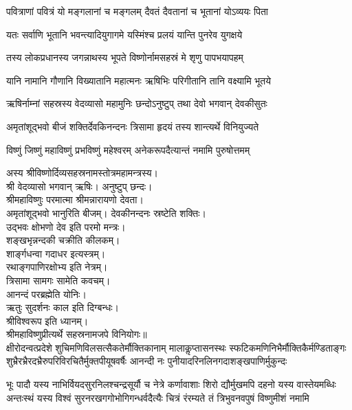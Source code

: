 \twolineshloka
{पवित्राणां पवित्रं यो मङ्गलानां च मङ्गलम्}
{दैवतं दैवतानां च भूतानां योऽव्ययः पिता}

\twolineshloka
{यतः सर्वाणि भूतानि भवन्त्यादियुगागमे}
{यस्मिंश्च प्रलयं यान्ति पुनरेव युगक्षये}

\twolineshloka
{तस्य लोकप्रधानस्य जगन्नाथस्य भूपते}
{विष्णोर्नामसहस्रं मे शृणु पापभयापहम्}

\twolineshloka
{यानि नामानि गौणानि विख्यातानि महात्मनः}
{ऋषिभिः परिगीतानि तानि वक्ष्यामि भूतये}

\twolineshloka
{ऋषिर्नाम्नां सहस्रस्य वेदव्यासो महामुनिः}
{छन्दोऽनुष्टुप् तथा देवो भगवान् देवकीसुतः}

\twolineshloka
{अमृतांशूद्भवो बीजं शक्तिर्देवकिनन्दनः}
{त्रिसामा हृदयं तस्य शान्त्यर्थे विनियुज्यते}

\twolineshloka
{विष्णुं जिष्णुं महाविष्णुं प्रभविष्णुं महेश्वरम्}
{अनेकरूपदैत्यान्तं नमामि पुरुषोत्तमम्}

अस्य श्रीविष्णोर्दिव्यसहस्रनामस्तोत्रमहामन्त्रस्य।\\
श्री वेदव्यासो भगवान् ऋषिः। अनुष्टुप् छन्दः।\\
श्रीमहाविष्णुः परमात्मा श्रीमन्नारायणो देवता।\\
अमृतांशूद्भवो भानुरिति बीजम्। देवकीनन्दनः स्रष्टेति शक्तिः।\\
उद्भवः क्षोभणो देव इति परमो मन्त्रः।\\
शङ्खभृन्नन्दकी चक्रीति कीलकम्।\\
शार्ङ्गधन्वा गदाधर इत्यस्त्रम्। \\
रथाङ्गपाणिरक्षोभ्य इति नेत्रम्। \\
त्रिसामा सामगः सामेति कवचम्।\\
आनन्दं परब्रह्मेति योनिः।\\
ऋतुः सुदर्शनः काल इति दिग्बन्धः। \\
श्रीविश्वरूप इति ध्यानम्।\\
श्रीमहाविष्णुप्रीत्यर्थे सहस्रनामजपे विनियोगः॥\\

\resetShloka
\setlength{\shlokaspaceskip}{12pt}
\fourlineindentedshloka
{क्षीरोदन्वत्प्रदेशे शुचिमणिविलसत्सैकतेर्मौक्तिकानाम्}
{मालाकॢप्तासनस्थः स्फटिकमणिनिभैर्मौक्तिकैर्मण्डिताङ्गः}
{शुभ्रैरभ्रैरदभ्रैरुपरिविरचितैर्मुक्तपीयूषवर्षैः}
{आनन्दी नः पुनीयादरिनलिनगदाशङ्खपाणिर्मुकुन्दः}

\fourlineindentedshloka
{भूः पादौ यस्य नाभिर्वियदसुरनिलश्चन्द्रसूर्यौ च नेत्रे}
{कर्णावाशाः शिरो द्यौर्मुखमपि दहनो यस्य वास्तेयमब्धिः}
{अन्तःस्थं यस्य विश्वं सुरनरखगगोभोगिगन्धर्वदैत्यैः}
{चित्रं रंरम्यते तं त्रिभुवनवपुषं विष्णुमीशं नमामि}

